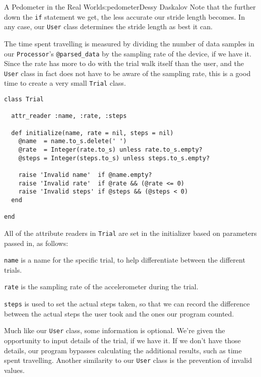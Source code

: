 \begin{aosachapter}{A Pedometer in the Real World}{s:pedometer}{Dessy Daskalov}
Note that the further down the \texttt{if} statement we get, the less
accurate our stride length becomes. In any case, our \texttt{User} class
determines the stride length as best it can.

\label{elapsed-time}

The time spent travelling is measured by dividing the number of data
samples in our \texttt{Processor}'s \texttt{@parsed\_data} by the
sampling rate of the device, if we have it. Since the rate has more to
do with the trial walk itself than the user, and the \texttt{User} class
in fact does not have to be aware of the sampling rate, this is a good
time to create a very small \texttt{Trial} class.

\begin{verbatim}
class Trial

  attr_reader :name, :rate, :steps

  def initialize(name, rate = nil, steps = nil)
    @name  = name.to_s.delete(' ')
    @rate  = Integer(rate.to_s) unless rate.to_s.empty?
    @steps = Integer(steps.to_s) unless steps.to_s.empty?

    raise 'Invalid name'  if @name.empty?
    raise 'Invalid rate'  if @rate && (@rate <= 0)
    raise 'Invalid steps' if @steps && (@steps < 0)
  end

end
\end{verbatim}

All of the attribute readers in \texttt{Trial} are set in the
initializer based on parameters passed in, as follows:

\begin{aosaitemize}

\item
  \texttt{name} is a name for the specific trial, to help differentiate
  between the different trials.
\item
  \texttt{rate} is the sampling rate of the accelerometer during the
  trial.
\item
  \texttt{steps} is used to set the actual steps taken, so that we can
  record the difference between the actual steps the user took and the
  ones our program counted.
\end{aosaitemize}

Much like our \texttt{User} class, some information is optional. We're
given the opportunity to input details of the trial, if we have it. If
we don't have those details, our program bypasses calculating the
additional results, such as time spent travelling. Another similarity to
our \texttt{User} class is the prevention of invalid values.


\end{aosachapter}
